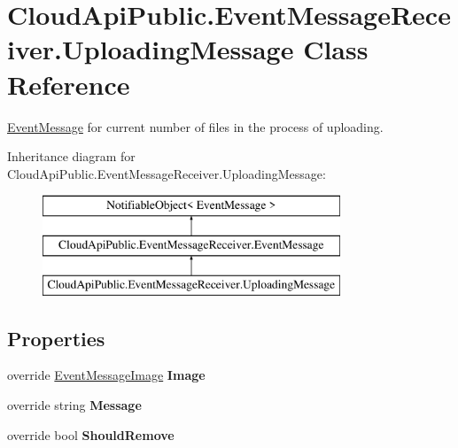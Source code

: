 \hypertarget{class_cloud_api_public_1_1_event_message_receiver_1_1_uploading_message}{\section{Cloud\-Api\-Public.\-Event\-Message\-Receiver.\-Uploading\-Message Class Reference}
\label{class_cloud_api_public_1_1_event_message_receiver_1_1_uploading_message}
}


\hyperlink{class_cloud_api_public_1_1_event_message_receiver_1_1_event_message}{Event\-Message} for current number of files in the process of uploading.  


Inheritance diagram for Cloud\-Api\-Public.\-Event\-Message\-Receiver.\-Uploading\-Message\-:\begin{figure}[H]
\begin{center}
\leavevmode
\includegraphics[height=3.000000cm]{class_cloud_api_public_1_1_event_message_receiver_1_1_uploading_message}
\end{center}
\end{figure}
\subsection*{Properties}
\begin{DoxyCompactItemize}
\item 
\hypertarget{class_cloud_api_public_1_1_event_message_receiver_1_1_uploading_message_a03cb2e79b3daae0b20eee74358e8b153}{override \hyperlink{namespace_cloud_api_public_1_1_static_aefcc1e7e1c81366ec3f6affd41c1f817}{Event\-Message\-Image} {\bfseries Image}}\label{class_cloud_api_public_1_1_event_message_receiver_1_1_uploading_message_a03cb2e79b3daae0b20eee74358e8b153}

\item 
\hypertarget{class_cloud_api_public_1_1_event_message_receiver_1_1_uploading_message_af72ea33c116de3e2d69e67218e32b1c0}{override string {\bfseries Message}}\label{class_cloud_api_public_1_1_event_message_receiver_1_1_uploading_message_af72ea33c116de3e2d69e67218e32b1c0}

\item 
\hypertarget{class_cloud_api_public_1_1_event_message_receiver_1_1_uploading_message_a0c4474eb7ebb36b91b16f5937a2c0ea4}{override bool {\bfseries Should\-Remove}}\label{class_cloud_api_public_1_1_event_message_receiver_1_1_uploading_message_a0c4474eb7ebb36b91b16f5937a2c0ea4}

\end{DoxyCompactItemize}
